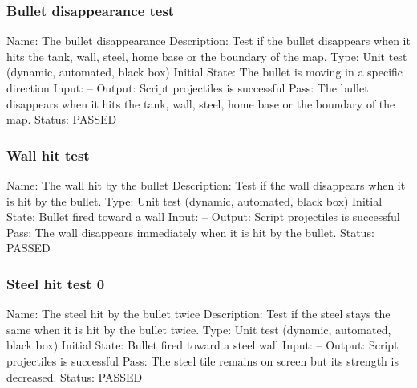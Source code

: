 \documentclass{article}
\begin{document}
\subsubsection{Bullet disappearance test}
\label{sec:3.1.19}
Name:  The bullet disappearance \newline
Description: Test if the bullet disappears when it hits the tank, wall, steel,
 home base or the boundary of the map. \newline
Type: Unit test (dynamic, automated, black box) \newline
Initial State:  The bullet is moving in a specific direction\newline
Input: --\newline
Output: Script projectiles is successful  \newline
Pass: The bullet disappears when it hits the tank, wall, steel, home base or 
the boundary of the map. \newline
\newline Status: PASSED

\subsubsection{Wall hit test}
\label{sec:3.1.20}
Name:  The wall hit by the bullet\newline
Description: Test if the wall disappears when it is hit by the bullet. \newline
Type: Unit test (dynamic, automated, black box) \newline
Initial State:  Bullet fired toward a wall \newline
Input: --\newline
Output: Script projectiles is successful  \newline
Pass:  The wall disappears immediately when it is hit by the bullet. \newline
\newline Status: PASSED

\subsubsection{Steel hit test 0}
\label{sec:3.1.21}
Name:  The steel hit by the bullet twice\newline
Description: Test if the steel stays the same when it is hit by the bullet 
twice. \newline
Type: Unit test (dynamic, automated, black box) \newline
Initial State:  Bullet fired toward a steel wall \newline
Input: --\newline
Output: Script projectiles is successful  \newline
Pass:  The steel tile remains on screen but its strength is decreased. \newline
\newline Status: PASSED
\end{document}
